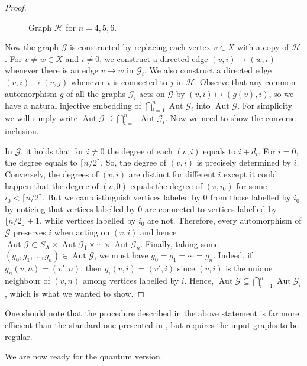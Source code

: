 \documentclass[12pt]{amsart}
\theoremstyle{definition}
\theoremstyle{definition}
\theoremstyle{definition}
\theoremstyle{definition}
\DeclareMathOperator{\Aut}{Aut}
\newcommand{\Gr}{\mathcal{G}}
\newcommand{\Hr}{\mathcal{H}}
\numberwithin{equation}{section}
\begin{document}
\begin{proof}
\begin{figure}[t]
{{
}\hfil}
    \caption{Graph $\Hr$ for $n=4,5,6$.}
    \label{fig:H}
\end{figure}

Now the graph $\Gr$ is constructed by replacing each vertex $v\in X$ with a copy of $\Hr$. For $v\neq w \in X$ and $i\neq 0$, we construct a directed edge $(v,i)\to(w,i)$ whenever there is an edge $v\to w$ in $\Gr_i$.  We also construct a directed edge $(v,i)\to(v,j)$ whenever $i$ is connected to $j$ in $\mathcal H$.  Observe that any common automorphism $g$ of all the graphs $\Gr_i$ acts on $\Gr$ by $(v,i)\mapsto (g(v),i)$, so we have a natural injective embedding of  $\bigcap_{i=1}^n\Aut\Gr_i$ into $\Aut \Gr$. For simplicity we will simply write $\Aut\Gr\supseteq\bigcap_{i=1}^n\Aut\Gr_i$. Now we need to show the converse inclusion.

In $\Gr$, it holds that for $i\neq 0$ the degree of each $(v,i)$ equals to $i+d_i$. For $i=0$, the degree equals to $\lceil n/2\rceil$. So, the degree of $(v,i)$ is precisely determined by $i$. Conversely, the degrees of $(v,i)$ are distinct for different $i$ except it could happen that the degree of $(v,0)$ equals the degree of $(v,i_0)$ for some $i_0<\lceil n/2\rceil$. But we can distinguish vertices labeled by $0$ from those labelled by $i_0$ by noticing that vertices labelled by 0 are connected to vertices labelled by $\lfloor n/2\rfloor+1$, while vertices labelled by $i_0$ are not. Therefore, every automorphism of $\Gr$ preserves $i$ when acting on $(v,i)$ and hence $\Aut \Gr\subset S_X\times\Aut \Gr_1\times\cdots\times\Aut \Gr_n$. Finally, taking some $(g_0,g_1,\dots,g_n)\in\Aut \Gr$, we must have $g_0=g_1=\cdots=g_n$. Indeed, if $g_n(v,n)=(v',n)$, then $g_i(v,i)=(v',i)$ since $(v,i)$ is the unique neighbour of $(v,n)$ among vertices labelled by $i$. Hence, $\Aut \Gr\subseteq\bigcap_{i=1}^n\Aut \Gr_i$, which is what we wanted to show. 
\end{proof}

One should note that the procedure described in the above statement is far more efficient than the standard one presented in \cite{Fru39}, but requires the input graphs to be regular.

We are now ready for the quantum version. 
\end{document}
